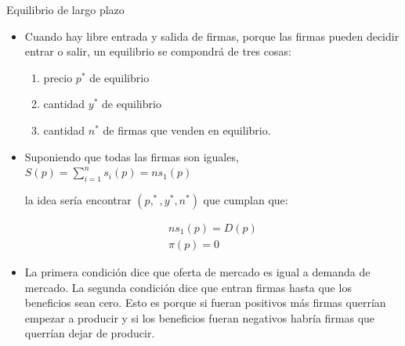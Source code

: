 \documentclass{beamer}
\theoremstyle{definition}
\begin{document}
\begin{frame}{Equilibrio de largo plazo}
\begin{itemize}
 \item   Cuando hay libre entrada y salida de firmas, porque las firmas pueden decidir entrar o salir, un equilibrio se compondrá de tres cosas:
    \begin{enumerate}
    \item precio $p^*$ de equilibrio
    \item cantidad $y^*$ de equilibrio
    \item cantidad $n^*$ de firmas que venden en equilibrio.
    \end{enumerate}
    
    \item Suponiendo que todas las firmas son iguales, $S(p) = \sum_{i=1}^{n}s_{i}(p)=ns_1(p)$
    
    la idea sería encontrar $(p,^*,y^*,n^*)$ que cumplan que: 
    
\begin{align*}
    ns_1(p)=D(p)\\
    \pi(p)=0
\end{align*}

\item La primera condición dice que oferta de mercado es igual a demanda de mercado. La segunda condición dice que entran firmas hasta que los beneficios sean cero. Esto es porque si fueran positivos más firmas querrían empezar a producir y si los beneficios fueran negativos habría firmas que querrían dejar de producir.
    
    \end{itemize}
\end{frame}
\end{document}
